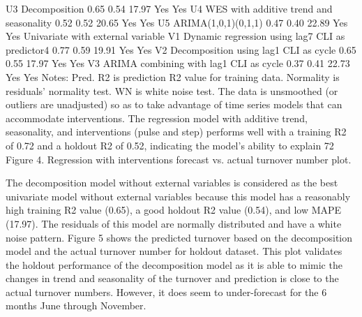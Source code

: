 	U3	Decomposition	0.65	0.54	17.97	Yes	Yes
	U4	WES with additive trend and seasonality	0.52	0.52	20.65	Yes	Yes
	U5	ARIMA(1,0,1)(0,1,1)	0.47	0.40	22.89	Yes	Yes
Univariate with external variable	V1	Dynamic regression using  lag7 CLI as predictor4	0.77	0.59	19.91	Yes	Yes
	V2	Decomposition using  lag1 CLI as cycle	0.65	0.55	17.97	Yes	Yes
	V3	ARIMA combining with lag1 CLI as cycle	0.37	0.41	22.73	Yes	Yes
Notes: 
	Pred. R2 is prediction R2 value for training data. 
	Normality is residuals’ normality test. 
	WN is white noise test. 
	The data is unsmoothed (or outliers are unadjusted) so as to take advantage of time series models that can accommodate interventions. 
The regression model with additive trend, seasonality, and interventions (pulse and step) performs well with a training  R2 of 0.72 and a holdout R2 of 0.52, indicating the model’s ability to explain 72%
Figure 4. Regression with interventions forecast vs. actual turnover number plot.

The decomposition model without external variables is considered as the best univariate model without external variables because this model has a reasonably high training R2 value (0.65), a good holdout R2 value (0.54), and low MAPE (17.97). The residuals of this model are normally distributed and have a white noise pattern. Figure 5 shows the predicted turnover based on the decomposition model and the actual turnover number for holdout dataset. This plot validates the holdout performance of the decomposition model as it is able to mimic the changes in trend and seasonality of the turnover and prediction is close to the actual turnover numbers. However, it does seem to under-forecast for the 6 months June through November.
 

